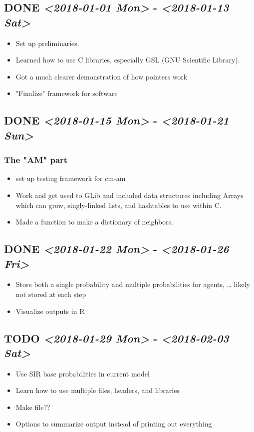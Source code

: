 \documentclass{article}
\begin{document}
\subsection{{\bfseries\sffamily DONE} \textit{<2018-01-01 Mon>} - \textit{<2018-01-13 Sat>}}
\label{sec-6-1}
\begin{itemize}
\item Set up preliminaries.
\item Learned how to use C libraries, especially GSL (GNU Scientific Library).
\item Got a much clearer demonstration of how pointers work
\item "Finalize" framework for software
\end{itemize}

\subsection{{\bfseries\sffamily DONE} \textit{<2018-01-15 Mon>} - \textit{<2018-01-21 Sun>}}
\label{sec-6-2}
\subsubsection{The "AM" part}
\label{sec-6-2-1}
\begin{itemize}
\item set up testing framework for cm-am
\item Work and get used to GLib and included data structures including Arrays which can grow, singly-linked lists, and hashtables to use within C.
\item Made a function to make a dictionary of neighbors.
\end{itemize}
\subsection{{\bfseries\sffamily DONE} \textit{<2018-01-22 Mon>} - \textit{<2018-01-26 Fri>}}
\label{sec-6-3}
\begin{itemize}
\item Store both a single probability and multiple probabilities for agents, \ldots{} likely not stored at each step
\item Visualize outputs in R
\end{itemize}
\subsection{{\bfseries\sffamily TODO} \textit{<2018-01-29 Mon>} - \textit{<2018-02-03 Sat>}}
\label{sec-6-4}
\begin{itemize}
\item Use SIR base probabilities in current model
\item Learn how to use multiple files, headers, and libraries
\item Make file??
\item Options to summarize output instead of printing out everything
\end{itemize}
\end{document}
